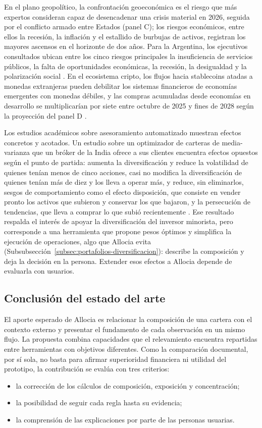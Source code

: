 En el plano geopolítico, la confrontación geoeconómica es el riesgo que más expertos consideran capaz de desencadenar una crisis material en 2026, seguida por el conflicto armado entre Estados (panel C); los riesgos económicos, entre ellos la recesión, la inflación y el estallido de burbujas de activos, registran los mayores ascensos en el horizonte de dos años. Para la Argentina, los ejecutivos consultados ubican entre los cinco riesgos principales la insuficiencia de servicios públicos, la falta de oportunidades económicas, la recesión, la desigualdad y la polarización social \parencite{WEF2026risks}. En el ecosistema cripto, los flujos hacia stablecoins atadas a monedas extranjeras pueden debilitar los sistemas financieros de economías emergentes con monedas débiles, y las compras acumuladas desde economías en desarrollo se multiplicarían por siete entre octubre de 2025 y fines de 2028 según la proyección del panel D \parencite{WEF2026risks}.

Los estudios académicos sobre asesoramiento automatizado muestran efectos concretos y acotados. Un estudio sobre un optimizador de carteras de media-varianza que un bróker de la India ofrece a sus clientes encuentra efectos opuestos según el punto de partida: aumenta la diversificación y reduce la volatilidad de quienes tenían menos de cinco acciones, casi no modifica la diversificación de quienes tenían más de diez y los lleva a operar más, y reduce, sin eliminarlos, sesgos de comportamiento como el efecto disposición, que consiste en vender pronto los activos que subieron y conservar los que bajaron, y la persecución de tendencias, que lleva a comprar lo que subió recientemente \parencite{DAcunto2019robo}. Ese resultado respalda el interés de apoyar la diversificación del inversor minorista, pero corresponde a una herramienta que propone pesos óptimos y simplifica la ejecución de operaciones, algo que Allocia evita (Subsubsección~\ref{subsec:portafolios-diversificacion}): describe la composición y deja la decisión en la persona. Extender esos efectos a Allocia depende de evaluarla con usuarios.

\subsection{Conclusión del estado del arte}\label{sec:diferenciacion}

El aporte esperado de Allocia es relacionar la composición de una cartera con el contexto externo y presentar el fundamento de cada observación en un mismo flujo. La propuesta combina capacidades que el relevamiento encuentra repartidas entre herramientas con objetivos diferentes. Como la comparación documental, por sí sola, no basta para afirmar superioridad financiera ni utilidad del prototipo, la contribución se evalúa con tres criterios:
\begin{itemize}
\item la corrección de los cálculos de composición, exposición y concentración;
\item la posibilidad de seguir cada regla hasta su evidencia;
\item la comprensión de las explicaciones por parte de las personas usuarias.
\end{itemize}

